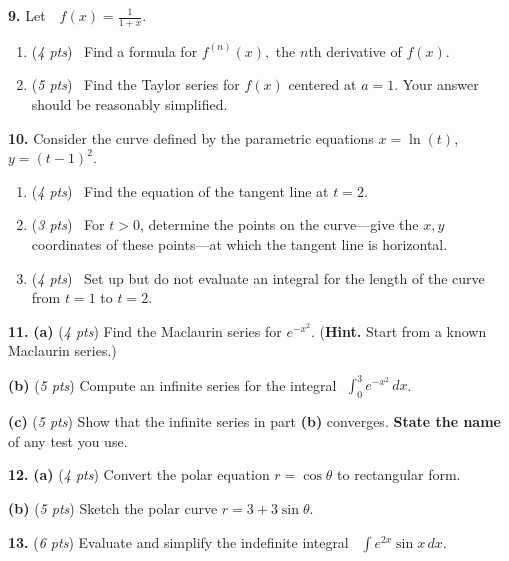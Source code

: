 \documentclass[12pt]{article}
\renewcommand{\emph}[1]{\textsf{\textbf{#1}}}
\let\ds\displaystyle
\newcommand{\prob}[1]{\bigskip\noindent\textbf{#1.} }
\newcommand{\pts}[1]{{\small (\textsl{#1})}}
\newcommand{\probpts}[2]{\prob{#1} \pts{#2 pts} \quad}
\newcommand{\ppartpts}[2]{\textbf{(#1)} \pts{#2 pts} \quad}
\newcommand{\epartpts}[2]{\medskip\noindent \textbf{(#1)} \pts{#2 pts} \quad}
\begin{document}
\newpage
\prob{9} Let \,\, $\ds f(x)=\frac{1}{1+x}$. 
	\begin{enumerate}[leftmargin=7mm]
	\item \pts{4 pts} \, Find a formula for $f^{(n)}(x),$ the $n$th derivative of $f(x).$
	\vspace{3.0in}
	\item \pts{5 pts} \, Find the Taylor series for $f(x)$ centered at $a=1$. Your answer should be reasonably simplified.
	\vfill
	\end{enumerate}


\newpage
\prob{10} Consider the curve defined by the parametric equations \hspace{.2in} {\large $x=\ln(t)$, \hspace{.1in} $y=(t-1)^2$}.
	\begin{enumerate}[leftmargin=7mm]
	\item \pts{4 pts} \,  Find the equation of the tangent line at $t=2$.
	\vfill
	\item \pts{3 pts} \,  For $t>0$, determine the points on the curve---give the $x,y$ coordinates of these points---at which the tangent line is horizontal.
	\vfill
	\item \pts{4 pts} \,  Set up but do not evaluate an integral for the length of the curve from $t=1$ to $t=2.$
	\vspace{1.6in}
	\end{enumerate}  


\newpage
\prob{11}  \ppartpts{a}{4}  Find the Maclaurin series for {\large $\ds e^{-x^2}$}.  (\emph{Hint.}  Start from a known Maclaurin series.) \\
\vfill

\epartpts{b}{5}  Compute an infinite series for the integral \,\,$\ds \int_0^3 e^{-x^2}\,dx$.
\vfill

\epartpts{c}{5}  Show that the infinite series in part \textbf{(b)} converges.  \textbf{State the name} of any test you use.
\vfill


\newpage
\prob{12}  \ppartpts{a}{4} Convert the polar equation $r=\cos \theta$ to rectangular form.
\vfill

\epartpts{b}{5} Sketch the polar curve $r=3+3\sin\theta.$\\



\vspace{-4mm}

\clearpage\newpage
\probpts{13}{6}  Evaluate and simplify the indefinite integral \, $\ds \int e^{2x}\sin x\,dx$.
\vfill
\end{document}
